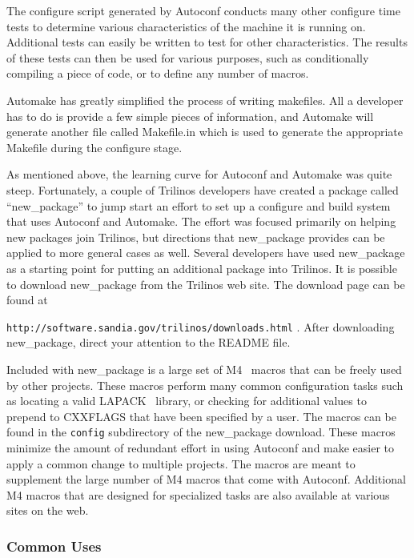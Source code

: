 \documentclass[12pt,relax]{article}
\newcommand{\InlineDirectory}[1]{
  {\hspace{0.01 in}} {\tt #1} {\hspace{0.01 in}}}
\begin{document}
The configure script generated by Autoconf conducts many other configure 
time tests to determine various 
characteristics of the machine it is running on.  Additional tests can 
easily be written to test for other characteristics.  The results of these 
tests can then be used for various purposes, such as conditionally compiling 
a piece of code, or to define any number of macros.

Automake has greatly simplified the process of writing makefiles.  All a 
developer has to do is provide a few simple pieces of information, and 
Automake will generate another file called Makefile.in which is used to 
generate the appropriate Makefile during the configure stage.

As mentioned above, the learning curve for Autoconf and Automake was quite 
steep.  Fortunately, a couple of Trilinos developers have created a package 
called ``new\_package'' to jump start an effort to set up a configure and 
build system that uses Autoconf and Automake.  The effort was focused 
primarily on helping new packages join Trilinos, but directions that 
new\_package provides can be applied to more general cases as well.  Several
developers have used new\_package as a starting point for putting an additional
package into Trilinos.  It is possible to download new\_package from the 
Trilinos web site.  The download page can be found at \newline 
\InlineDirectory{http://software.sandia.gov/trilinos/downloads.html}.  After
downloading new\_package, direct your attention to the README file.

Included with new\_package is a large set of M4~\cite{M4} macros that can 
be freely used by other projects.  These macros perform many common 
configuration tasks such as locating a valid LAPACK~\cite{lapack} library, 
or checking for additional values to prepend to CXXFLAGS that have been 
specified by a user.  The macros can be found in the \InlineDirectory{config}
subdirectory of the new\_package download.  These macros minimize the amount of
redundant effort in using Autoconf and make easier to apply a common change to 
multiple projects.  The macros are meant to supplement the large number of 
M4 macros that come with Autoconf.  Additional M4 macros that are designed for 
specialized tasks are also available at various sites on the web.

\subsubsection{Common Uses}
\end{document}
